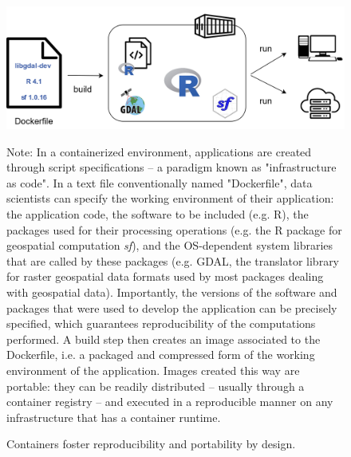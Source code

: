 \documentclass[graybox]{svmult}
\begin{document}
\begin{figure}[htbp]
    \begin{center}
        \includegraphics[width=0.85\linewidth]{figures/containers-portability.png}
    \end{center}
    \caption{Containers foster reproducibility and portability by design.}
    \label{fig:containers-portability}
    \medskip
    {\footnotesize Note: In a containerized environment, applications are created through script specifications -- a paradigm known as "infrastructure as code". In a text file conventionally named "Dockerfile", data scientists can specify the working environment of their application: the application code, the software to be included (e.g. R), the packages used for their processing operations (e.g. the R package for geospatial computation \textit{sf}), and the OS-dependent system libraries that are called by these packages (e.g. GDAL, the translator library for raster geospatial data formats used by most packages dealing with geospatial data). Importantly, the versions of the software and packages that were used to develop the application can be precisely specified, which guarantees reproducibility of the computations performed. A build step then creates an image associated to the Dockerfile, i.e. a packaged and compressed form of the working environment of the application. Images created this way are portable: they can be readily distributed -- usually through a container registry -- and executed in a reproducible manner on any infrastructure that has a container runtime. 
    }
\end{figure}
\end{document}
